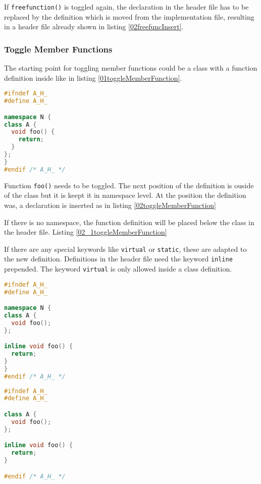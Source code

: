 If \texttt{freefunction()} is toggled again, the declaration in the header file
has to be replaced by the definition which is moved from the implementation
file, resulting in a header file already shown in listing
\nolinebreak\ref{02freefuncInsert}.

\subsubsection{Toggle Member Functions}

The starting point for toggling member functions could be a class with a
function definition inside like in listing
\nolinebreak\ref{01toggleMemberFunction}.

\begin{lstlisting}[caption={A.h, function definition inside class declaration},
label={01toggleMemberFunction}, language=C++]
#ifndef A_H_
#define A_H_

namespace N {
class A {
  void foo() {
    return;
  }
};
}
#endif /* A_H_ */
\end{lstlisting}

Function \texttt{foo()} needs to be toggled. The next position of the
definition is ouside of the class but it is keept it in namespace level. At the
position the definition was, a declaration is inserted as in listing
\ref{02toggleMemberFunction}

If there is no namespace, the function definition will be placed below the
class in the header file. Listing \ref{02_1toggleMemberFunction}

If there are any special keywords like \texttt{virtual} or \texttt{static},
these are adapted to the new definition. Definitions in the header file need
the keyword \texttt{inline} prepended. The keyword \texttt{virtual}
is only allowed inside a class definition.

\begin{lstlisting}[caption={A.h, function definition outside class definition in
header}, label={02toggleMemberFunction}, language=C++]
#ifndef A_H_
#define A_H_

namespace N {
class A {
  void foo();
};

inline void foo() {
  return;
}
}
#endif /* A_H_ */
\end{lstlisting}

\begin{lstlisting}[caption={A.h,
function definition outside class definition without namespace},
label={02_1toggleMemberFunction}, language=C++]
#ifndef A_H_
#define A_H_

class A {
  void foo();
};

inline void foo() {
  return;
}

#endif /* A_H_ */
\end{lstlisting}

